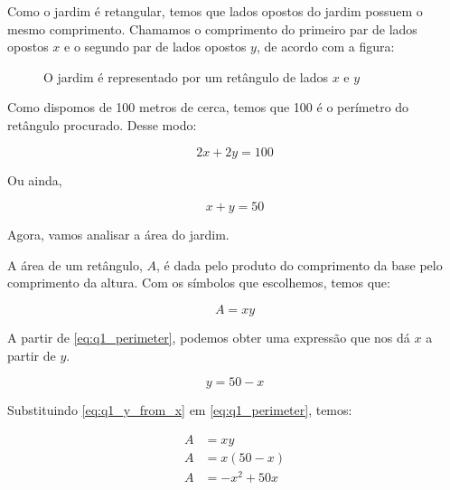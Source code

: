 \documentclass{article}
\begin{document}
Como o jardim é retangular, temos que lados opostos do jardim possuem
o mesmo comprimento. Chamamos o comprimento do primeiro par de lados
opostos \(x\) e o segundo par de lados opostos \(y\), de acordo com a figura:

\begin{figure}[H]
    \centering

    \caption{O jardim é representado por um retângulo de lados \(x\) e \(y\)}
\end{figure}

Como dispomos de 100 metros de cerca, temos que 100 é o perímetro
do retângulo procurado. Desse modo:

\begin{equation}
    2x + 2y = 100
\end{equation}

Ou ainda,

\begin{equation}\label{eq:q1_perimeter}
    x + y = 50
\end{equation}

Agora, vamos analisar a área do jardim.

A área de um retângulo, \(A\), é dada pelo produto do comprimento da base pelo
comprimento da altura. Com os símbolos que escolhemos, temos que:

\begin{equation}\label{eq:q1_area_rectangle_xy}
    A = xy
\end{equation}

A partir de \ref{eq:q1_perimeter}, podemos obter uma expressão que nos dá \(x\) a
partir de \(y\).

\begin{equation}\label{eq:q1_y_from_x}
    y = 50 - x
\end{equation}

Substituindo \ref{eq:q1_y_from_x} em \ref{eq:q1_perimeter}, temos:

\begin{align*}
    A & = xy          \\
    A & = x(50 - x)   \\
    A & = - x^2 + 50x \\
\end{align*}
\end{document}
